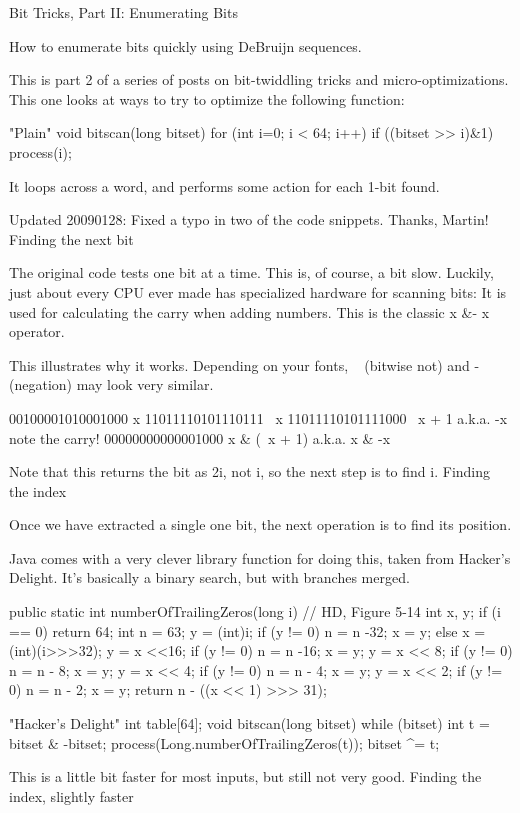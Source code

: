 {{{{{{Bit Tricks, Part II: Enumerating Bits

How to enumerate bits quickly using DeBruijn sequences.

This is part 2 of a series of posts on bit-twiddling tricks and micro-optimizations. This one looks at ways to try to optimize the following function:

"Plain"
void bitscan(long bitset) {
  for (int i=0; i < 64; i++)
    if ((bitset >> i)&1) process(i);
}

It loops across a word, and performs some action for each 1-bit found.

Updated 20090128: Fixed a typo in two of the code snippets. Thanks, Martin!
Finding the next bit

The original code tests one bit at a time. This is, of course, a bit slow. Luckily, just about every CPU ever made has specialized hardware for scanning bits: It is used for calculating the carry when adding numbers. This is the classic x &- x operator.

This illustrates why it works. Depending on your fonts, ~ (bitwise not) and - (negation) may look very similar.

00100001010001000   x
11011110101110111   ~x  
11011110101111000   ~x + 1         a.k.a. -x       note the carry!
00000000000001000   x & (~x + 1)   a.k.a. x & -x

Note that this returns the bit as 2i, not i, so the next step is to find i.
Finding the index

Once we have extracted a single one bit, the next operation is to find its position.

Java comes with a very clever library function for doing this, taken from Hacker's Delight. It's basically a binary search, but with branches merged.

    public static int numberOfTrailingZeros(long i) {
        // HD, Figure 5-14
	int x, y;
	if (i == 0) return 64;
	int n = 63;
	y = (int)i; if (y != 0) { n = n -32; x = y; } else x = (int)(i>>>32);
	y = x <<16; if (y != 0) { n = n -16; x = y; }
	y = x << 8; if (y != 0) { n = n - 8; x = y; }
	y = x << 4; if (y != 0) { n = n - 4; x = y; }
	y = x << 2; if (y != 0) { n = n - 2; x = y; }
	return n - ((x << 1) >>> 31);
    }

"Hacker's Delight"
int table[64];
void bitscan(long bitset) {
  while (bitset) {
     int t = bitset & -bitset;
     process(Long.numberOfTrailingZeros(t));
     bitset ^= t;
  }
}

This is a little bit faster for most inputs, but still not very good.
Finding the index, slightly faster

}}}}}}
